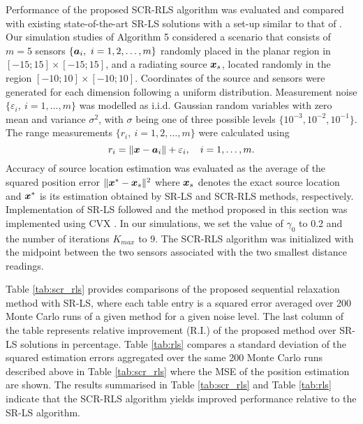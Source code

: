 Performance of the proposed SCR-RLS algorithm was evaluated and compared with existing state-of-the-art SR-LS solutions \cite{BeckStLi} with a set-up similar to that of \cite{BeckStLi}.   Our simulation studies of Algorithm 5 considered a scenario that consists of  $m = 5$ sensors $\{\mbox{\boldmath$a$}_i, \ i=1, 2,\ldots,m\}$ randomly placed in the planar region in $[-15;15]\times[-15;15]$, and a radiating source $\mbox{\boldmath$x$}_s$, located randomly in the region $[-10;10]\times[-10;10]$. Coordinates of the source and sensors were generated for each dimension following a uniform distribution. 
Measurement noise $\{\varepsilon_i, \ i=1,\ldots, m\}$ was modelled as i.i.d. Gaussian random variables with zero mean and variance $\sigma^2$, with $\sigma$ being one of three possible levels $\{10^{-3}, 10^{-2}, 10^{-1}\}$. The range measurements $\{r_i, \ i=1, 2,\ldots, m\}$ were calculated using 
\setcounter{abc}{0}
\begin{equation} \label{eq:5.0}
\nonumber
r_i = \|{\mbox{\boldmath$x$}} - {\mbox{\boldmath$a$}}_i\| + \varepsilon_i, \quad i = 1, \ldots , m.
\end{equation}
Accuracy of source location estimation was evaluated as the average of the squared position error $\|\mbox{\boldmath$x$}^* - \mbox{\boldmath$x$}_s\|^2$ where $\mbox{\boldmath$x$}_s$ denotes the exact source location and $\mbox{\boldmath$x$}^*$ is its estimation obtained by SR-LS and SCR-RLS methods, respectively. Implementation of SR-LS followed \cite{BeckStLi} and the method proposed in this section was implemented using CVX \cite{cvx}. In our simulations, we set the value of $\gamma_0$ to 0.2 and the number of iterations $K_{max}$ to 9. The SCR-RLS algorithm was initialized with the midpoint between the two sensors associated with the two smallest distance readings. 


Table \ref{tab:scr_rls} provides comparisons of the proposed sequential relaxation method with SR-LS, where each table entry is a squared error averaged over 200 Monte Carlo runs of a given method for a given noise level. The last column of the table  represents relative improvement (R.I.) of the proposed method over SR-LS solutions in percentage. %
Table \ref{tab:rls} compares a standard deviation of the squared  estimation errors  aggregated over the  same 200 Monte Carlo runs described above in Table \ref{tab:scr_rls} where the MSE of the position estimation are shown. The results
summarised in  Table \ref{tab:scr_rls} and Table \ref{tab:rls} indicate that the SCR-RLS algorithm yields improved performance relative to the SR-LS algorithm.

